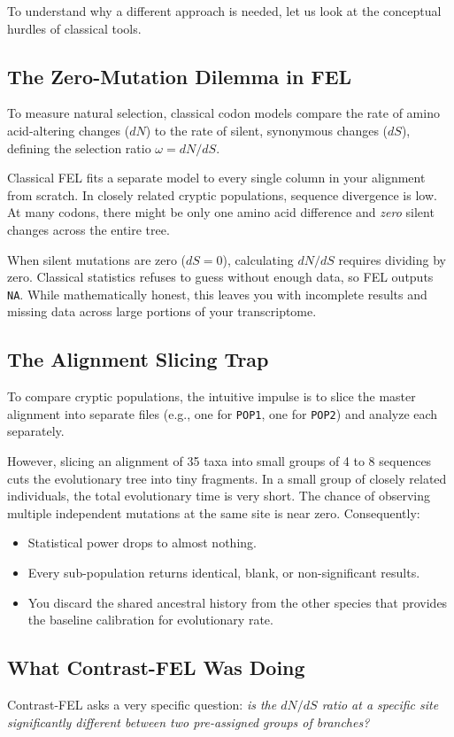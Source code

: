 \documentclass[11pt,a4paper]{article}
\begin{document}
To understand why a different approach is needed, let us look at the conceptual hurdles of classical tools.

\subsection{The Zero-Mutation Dilemma in FEL}
To measure natural selection, classical codon models compare the rate of amino acid-altering changes ($dN$) to the rate of silent, synonymous changes ($dS$), defining the selection ratio $\omega = dN / dS$. 

Classical FEL fits a separate model to every single column in your alignment from scratch. In closely related cryptic populations, sequence divergence is low. At many codons, there might be only one amino acid difference and \textit{zero} silent changes across the entire tree. 

When silent mutations are zero ($dS = 0$), calculating $dN / dS$ requires dividing by zero. Classical statistics refuses to guess without enough data, so FEL outputs \texttt{NA}. While mathematically honest, this leaves you with incomplete results and missing data across large portions of your transcriptome.

\subsection{The Alignment Slicing Trap}
To compare cryptic populations, the intuitive impulse is to slice the master alignment into separate files (e.g., one for \texttt{POP1}, one for \texttt{POP2}) and analyze each separately.

However, slicing an alignment of 35 taxa into small groups of 4 to 8 sequences cuts the evolutionary tree into tiny fragments. In a small group of closely related individuals, the total evolutionary time is very short. The chance of observing multiple independent mutations at the same site is near zero. Consequently:
\begin{itemize}
    \item Statistical power drops to almost nothing.
    \item Every sub-population returns identical, blank, or non-significant results.
    \item You discard the shared ancestral history from the other species that provides the baseline calibration for evolutionary rate.
\end{itemize}

\subsection{What Contrast-FEL Was Doing}
Contrast-FEL asks a very specific question: \textit{is the $dN/dS$ ratio at a specific site significantly different between two pre-assigned groups of branches?}
\end{document}
